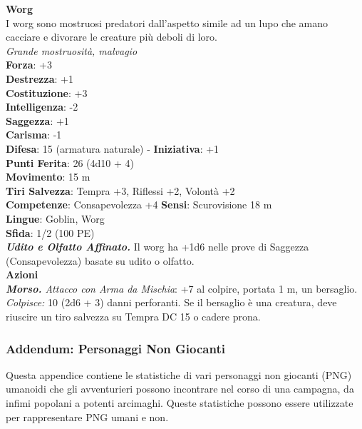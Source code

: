 \begin{multicols}{2}
\medskip\textbf{Worg}\\
I worg sono mostruosi predatori dall'aspetto simile ad un lupo che amano cacciare e divorare le creature più deboli di loro.\\
\emph{Grande mostruosità, malvagio}\\
\textbf{Forza}: +3\\
\textbf{Destrezza}: +1\\
\textbf{Costituzione}: +3\\
\textbf{Intelligenza}: -2\\
\textbf{Saggezza}: +1\\
\textbf{Carisma}: -1\\
\textbf{Difesa}: 15 (armatura naturale) - \textbf{Iniziativa}: +1\\
\textbf{Punti Ferita}: 26 (4d10 + 4)\\
\textbf{Movimento}: 15 m\\
\textbf{Tiri Salvezza}: Tempra +3, Riflessi +2, Volontà +2 \\
\textbf{Competenze}: Consapevolezza +4
\textbf{Sensi}: Scurovisione 18 m\\
\textbf{Lingue}: Goblin, Worg\\
\textbf{Sfida}: 1/2 (100 PE)\smallskip\\
\emph{\textbf{Udito e Olfatto Affinato.}} Il worg ha +1d6 nelle prove di Saggezza (Consapevolezza) basate su udito o olfatto.\\
\smallskip\textbf{Azioni}\\
\emph{\textbf{Morso.} Attacco con Arma da Mischia}: +7 al colpire, portata 1 m, un bersaglio.\\
\emph{Colpisce:} 10 (2d6 + 3) danni perforanti. Se il bersaglio è una creatura, deve riuscire un tiro salvezza su Tempra DC  15 o cadere prona. 

\pagebreak

\subsubsection{Addendum: Personaggi Non Giocanti}

Questa appendice contiene le statistiche di vari personaggi non giocanti (PNG) umanoidi che gli avventurieri possono incontrare nel corso di una campagna, da infimi popolani a potenti arcimaghi. Queste statistiche possono essere utilizzate per rappresentare PNG umani e non.\\


\end{multicols}
